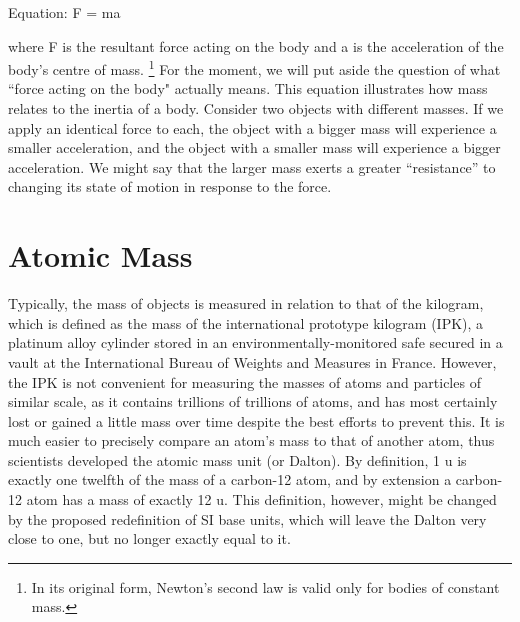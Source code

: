 \documentclass{book}
\begin{document}
Equation: F = ma

where F is the resultant force acting on the body and a is the acceleration of the body's centre of mass. \footnote{ In its original form, Newton's second law is valid only for bodies of constant mass.} For the moment, we will put aside the question of what ``force acting on the body" actually means. This equation illustrates how mass relates to the inertia of a body. Consider two objects with different masses. If we apply an identical force to each, the object with a bigger mass will experience a smaller acceleration, and the object with a smaller mass will experience a bigger acceleration. We might say that the larger mass exerts a greater ``resistance'' to changing its state of motion in response to the force.

\section{Atomic Mass}
Typically, the mass of objects is measured in relation to that of the kilogram, which is defined as the mass of the international prototype kilogram (IPK), a platinum alloy cylinder stored in an environmentally-monitored safe secured in a vault at the International Bureau of Weights and Measures in France. However, the IPK is not convenient for measuring the masses of atoms and particles of similar scale, as it contains trillions of trillions of atoms, and has most certainly lost or gained a little mass over time despite the best efforts to prevent this. It is much easier to precisely compare an atom's mass to that of another atom, thus scientists developed the atomic mass unit (or Dalton). By definition, 1 u is exactly one twelfth of the mass of a carbon-12 atom, and by extension a carbon-12 atom has a mass of exactly 12 u. This definition, however, might be changed by the proposed redefinition of SI base units, which will leave the Dalton very close to one, but no longer exactly equal to it.
\end{document}
